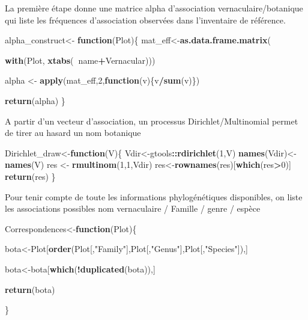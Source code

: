 \documentclass[
  11pt,
  french,
  A4paper,
  extrafontsizes,onecolumn,openright
  ]{memoir}
\newenvironment{Shaded}{\begin{snugshade}}{\end{snugshade}}
\newcommand{\KeywordTok}[1]{\textcolor[rgb]{0.13,0.29,0.53}{\textbf{#1}}}
\newcommand{\DecValTok}[1]{\textcolor[rgb]{0.00,0.00,0.81}{#1}}
\newcommand{\StringTok}[1]{\textcolor[rgb]{0.31,0.60,0.02}{#1}}
\newcommand{\ControlFlowTok}[1]{\textcolor[rgb]{0.13,0.29,0.53}{\textbf{#1}}}
\newcommand{\OperatorTok}[1]{\textcolor[rgb]{0.81,0.36,0.00}{\textbf{#1}}}
\newcommand{\NormalTok}[1]{#1}
\begin{document}
La première étape donne une matrice alpha d'association
vernaculaire/botanique qui liste les fréquences d'association observées
dans l'inventaire de référence.

\begin{Shaded}
\begin{Highlighting}[]
\NormalTok{alpha_construct<-}\StringTok{  }\ControlFlowTok{function}\NormalTok{(Plot)\{}
\NormalTok{  mat_eff<-}\KeywordTok{as.data.frame.matrix}\NormalTok{(}
    
    \KeywordTok{with}\NormalTok{(Plot, }\KeywordTok{xtabs}\NormalTok{(}\OperatorTok{~}\NormalTok{name}\OperatorTok{+}\NormalTok{Vernacular)))}
  
\NormalTok{  alpha <-}\StringTok{ }\KeywordTok{apply}\NormalTok{(mat_eff,}\DecValTok{2}\NormalTok{,}\ControlFlowTok{function}\NormalTok{(v)\{v}\OperatorTok{/}\KeywordTok{sum}\NormalTok{(v)\})}
  
  \KeywordTok{return}\NormalTok{(alpha)}
\NormalTok{\}}
\end{Highlighting}
\end{Shaded}

A partir d'un vecteur d'association, un processus Dirichlet/Multinomial
permet de tirer au hasard un nom botanique

\begin{Shaded}
\begin{Highlighting}[]
\NormalTok{Dirichlet_draw<-}\ControlFlowTok{function}\NormalTok{(V)\{}
\NormalTok{  Vdir<-gtools}\OperatorTok{::}\KeywordTok{rdirichlet}\NormalTok{(}\DecValTok{1}\NormalTok{,V)}
  \KeywordTok{names}\NormalTok{(Vdir)<-}\KeywordTok{names}\NormalTok{(V)}
\NormalTok{  res <-}\StringTok{ }\KeywordTok{rmultinom}\NormalTok{(}\DecValTok{1}\NormalTok{,}\DecValTok{1}\NormalTok{,Vdir)}
\NormalTok{  res<-}\KeywordTok{rownames}\NormalTok{(res)[}\KeywordTok{which}\NormalTok{(res}\OperatorTok{>}\DecValTok{0}\NormalTok{)]}
  \KeywordTok{return}\NormalTok{(res)}
\NormalTok{\}}
\end{Highlighting}
\end{Shaded}

Pour tenir compte de toute les informations phylogénétiques disponibles,
on liste les associations possibles nom vernaculaire / Famille / genre /
espèce

\begin{Shaded}
\begin{Highlighting}[]
\NormalTok{Correspondences<-}\ControlFlowTok{function}\NormalTok{(Plot)\{}
  
\NormalTok{  bota<-Plot[}\KeywordTok{order}\NormalTok{(Plot[,}\StringTok{"Family"}\NormalTok{],Plot[,}\StringTok{"Genus"}\NormalTok{],Plot[,}\StringTok{"Species"}\NormalTok{]),]}
  
\NormalTok{  bota<-bota[}\KeywordTok{which}\NormalTok{(}\OperatorTok{!}\KeywordTok{duplicated}\NormalTok{(bota)),]}
  
  \KeywordTok{return}\NormalTok{(bota)}
  
\NormalTok{\} }
\end{Highlighting}
\end{Shaded}
\end{document}
